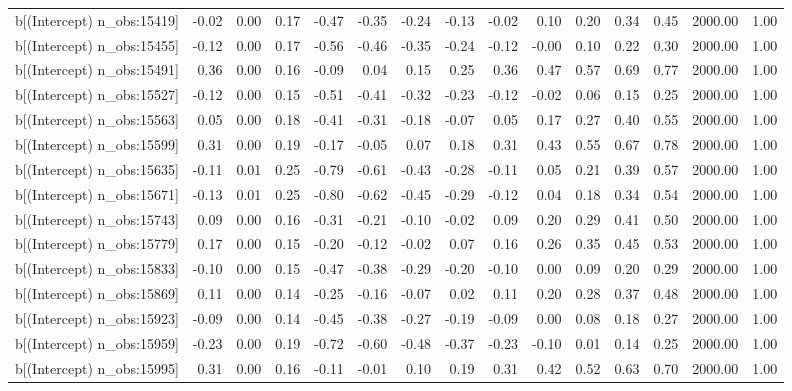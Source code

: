 \begin{table}[ht]
\begin{tabular}{rrrrrrrrrrrrrrr}
  b[(Intercept) n\_obs:15419] & -0.02 & 0.00 & 0.17 & -0.47 & -0.35 & -0.24 & -0.13 & -0.02 & 0.10 & 0.20 & 0.34 & 0.45 & 2000.00 & 1.00 \\ 
  b[(Intercept) n\_obs:15455] & -0.12 & 0.00 & 0.17 & -0.56 & -0.46 & -0.35 & -0.24 & -0.12 & -0.00 & 0.10 & 0.22 & 0.30 & 2000.00 & 1.00 \\ 
  b[(Intercept) n\_obs:15491] & 0.36 & 0.00 & 0.16 & -0.09 & 0.04 & 0.15 & 0.25 & 0.36 & 0.47 & 0.57 & 0.69 & 0.77 & 2000.00 & 1.00 \\ 
  b[(Intercept) n\_obs:15527] & -0.12 & 0.00 & 0.15 & -0.51 & -0.41 & -0.32 & -0.23 & -0.12 & -0.02 & 0.06 & 0.15 & 0.25 & 2000.00 & 1.00 \\ 
  b[(Intercept) n\_obs:15563] & 0.05 & 0.00 & 0.18 & -0.41 & -0.31 & -0.18 & -0.07 & 0.05 & 0.17 & 0.27 & 0.40 & 0.55 & 2000.00 & 1.00 \\ 
  b[(Intercept) n\_obs:15599] & 0.31 & 0.00 & 0.19 & -0.17 & -0.05 & 0.07 & 0.18 & 0.31 & 0.43 & 0.55 & 0.67 & 0.78 & 2000.00 & 1.00 \\ 
  b[(Intercept) n\_obs:15635] & -0.11 & 0.01 & 0.25 & -0.79 & -0.61 & -0.43 & -0.28 & -0.11 & 0.05 & 0.21 & 0.39 & 0.57 & 2000.00 & 1.00 \\ 
  b[(Intercept) n\_obs:15671] & -0.13 & 0.01 & 0.25 & -0.80 & -0.62 & -0.45 & -0.29 & -0.12 & 0.04 & 0.18 & 0.34 & 0.54 & 2000.00 & 1.00 \\ 
  b[(Intercept) n\_obs:15743] & 0.09 & 0.00 & 0.16 & -0.31 & -0.21 & -0.10 & -0.02 & 0.09 & 0.20 & 0.29 & 0.41 & 0.50 & 2000.00 & 1.00 \\ 
  b[(Intercept) n\_obs:15779] & 0.17 & 0.00 & 0.15 & -0.20 & -0.12 & -0.02 & 0.07 & 0.16 & 0.26 & 0.35 & 0.45 & 0.53 & 2000.00 & 1.00 \\ 
  b[(Intercept) n\_obs:15833] & -0.10 & 0.00 & 0.15 & -0.47 & -0.38 & -0.29 & -0.20 & -0.10 & 0.00 & 0.09 & 0.20 & 0.29 & 2000.00 & 1.00 \\ 
  b[(Intercept) n\_obs:15869] & 0.11 & 0.00 & 0.14 & -0.25 & -0.16 & -0.07 & 0.02 & 0.11 & 0.20 & 0.28 & 0.37 & 0.48 & 2000.00 & 1.00 \\ 
  b[(Intercept) n\_obs:15923] & -0.09 & 0.00 & 0.14 & -0.45 & -0.38 & -0.27 & -0.19 & -0.09 & 0.00 & 0.08 & 0.18 & 0.27 & 2000.00 & 1.00 \\ 
  b[(Intercept) n\_obs:15959] & -0.23 & 0.00 & 0.19 & -0.72 & -0.60 & -0.48 & -0.37 & -0.23 & -0.10 & 0.01 & 0.14 & 0.25 & 2000.00 & 1.00 \\ 
  b[(Intercept) n\_obs:15995] & 0.31 & 0.00 & 0.16 & -0.11 & -0.01 & 0.10 & 0.19 & 0.31 & 0.42 & 0.52 & 0.63 & 0.70 & 2000.00 & 1.00 \\ 

\end{tabular}
\end{table}
